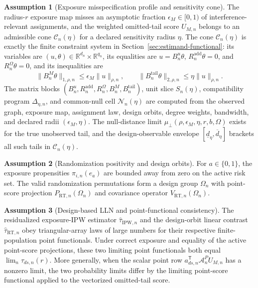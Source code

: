 \documentclass[11pt]{article}
\newcommand{\transpose}{\mathsf{T}}
\newcommand{\R}{\mathbb{R}}
\theoremstyle{definition}
\newtheorem{assumption}{Assumption}
\theoremstyle{plain}
\theoremstyle{remark}
\begin{document}
\begin{assumption}[Exposure misspecification profile and sensitivity cone]\label{ass:misspec-profile}
The radius-\(r\) exposure map misses an asymptotic fraction
\(\epsilon_M\in[0,1)\) of interference-relevant assignments, and the weighted
omitted-tail score \(U_{M,n}\) belongs to an admissible cone
\(\mathcal C_n(\eta)\) for a declared sensitivity radius \(\eta\).  The cone
\(\mathcal C_n(\eta)\) is exactly the finite constraint system in
Section~\ref{sec:estimand-functional}: its variables are
\((u,\theta)\in\R^{d_n}\times\R^{q_n}\), its equalities are
\(u=B^u_n\theta\), \(R^{\mathrm{add}}_n\theta=0\), and
\(R^\Omega_n\theta=0\), and its inequalities are
\[
  \|B^M_n\theta\|_{1,\rho,n}
  \le \epsilon_M\|u\|_{\rho,n},
  \qquad
  \|B^{\mathrm{tail}}_n\theta\|_{2,\rho,n}
  \le \eta\|u\|_{\rho,n}.
\]
The matrix blocks
\((B^u_n,R^{\mathrm{add}}_n,R^\Omega_n,B^M_n,B^{\mathrm{tail}}_n)\), unit
slice \(S_n(\eta)\), compatibility program \(\Delta_{\eta,n}\), and
common-null cell \(\mathcal N_n(\eta)\) are computed from the observed graph,
exposure map, assignment law, design orbits, degree weights, bandwidth, and
declared radii \((\epsilon_M,\eta)\).  The null-distance limit
\(\mu_{\perp}(\rho,\epsilon_M,\eta,r,b,\Omega)\) exists for the true
unobserved tail, and the design-observable envelope
\([\underline d_\eta,\overline d_\eta]\) brackets all such tails in
\(\mathcal C_n(\eta)\).
\end{assumption}

\begin{assumption}[Randomization positivity and design orbits]\label{ass:design-orbits}
For \(a\in\{0,1\}\), the exposure propensities
\(\pi_{i,n}(e_a)\) are bounded away from zero on the active risk set.  The
valid randomization permutations form a design group \(\Omega_n\) with
point-score projection \(P_{\mathrm{RT},n}(\Omega_n)\) and covariance operator
\(V_{\mathrm{RT},n}(\Omega_n)\).
\end{assumption}

\begin{assumption}[Design-based LLN and point-functional consistency]\label{ass:design-lln}
The residualized exposure-IPW estimator \(\hat\tau_{\mathrm{IPW},n}\) and the
design-orbit linear contrast \(\hat\tau_{\mathrm{RT},n}\) obey triangular-array
laws of large numbers for their respective finite-population point
functionals.  Under correct exposure and equality of the active point-score
projections, these two limiting point functionals both equal
\(\lim_n\tau_{ds,n}(r)\).  More generally, when the scalar point row
\(a_{ds,n}^{\transpose}\mathcal A^P_n U_{M,n}\) has a nonzero limit, the two
probability limits differ by the limiting point-score functional applied to
the vectorized omitted-tail score.
\end{assumption}
\end{document}
